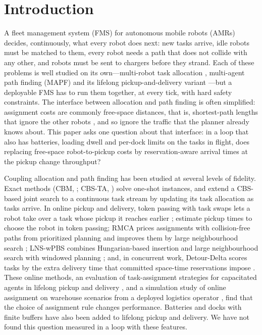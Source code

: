 \section{Introduction}\label{sec:intro}


A fleet management system (FMS) for autonomous mobile robots (AMRs) decides,
continuously, what every robot does next: new tasks arrive, idle robots must be
matched to them, every robot needs a path that does not collide with any other,
and robots must be sent to chargers before they strand. Each of these problems is well
studied on its own---multi-robot task allocation
\citep{gerkey2004formal,korsah2013comprehensive}, multi-agent path finding
(MAPF) \citep{stern2019mapf,sharon2015cbs} and its lifelong
pickup-and-delivery variant \citep{ma2017lifelong,li2021rhcr}---but a
deployable FMS has to run them together, at every tick, with hard safety
constraints. The interface between allocation and path finding is often
simplified: assignment costs are commonly free-space distances, that is,
shortest-path lengths that ignore the other robots
\citep{ma2017lifelong,liu2019task}, and so ignore the traffic that the planner
already knows about. This paper asks one question about that interface: in a loop
that also has batteries, loading dwell and per-dock limits on the tasks in
flight, does replacing free-space robot-to-pickup costs by reservation-aware
arrival times at the pickup change throughput?

Coupling allocation and path finding has been studied at several levels of
fidelity. Exact methods (CBM, \citealp{ma2016optimal}; CBS-TA,
\citealp{honig2018cbsta}) solve one-shot instances, and \citet{fan2025joint}
extend a CBS-based joint search to a continuous task stream by updating
its task allocation as tasks arrive. In online pickup and delivery, token passing with
task swaps lets a robot take over a task whose pickup it reaches earlier
\citep{ma2017lifelong}; \citet{shimokawa2022improvement} estimate pickup
times to choose the robot in token passing; RMCA prices assignments with
collision-free paths from prioritized planning and improves them by large
neighbourhood search \citep{chen2021integrated}; LNS-wPBS combines
Hungarian-based insertion and large neighbourhood search with windowed
planning \citep{xu2022multigoal}; and, in concurrent work, Detour-Delta scores
tasks by the extra delivery time that committed space-time reservations
impose \citep{hirayama2026detour}. These online methods, an evaluation of
task-assignment strategies for capacitated agents in lifelong pickup and
delivery \citep{cilden2025task}, and a simulation study of online assignment
on warehouse scenarios from a deployed logistics operator
\citep{zhu2026combined},
find that the choice of assignment rule changes performance. Batteries
\citep{kudo2024anytime,bavaro2025mapdb,tang2026energy} and docks with finite buffers
\citep{zang2026handover} have also been added to lifelong pickup and
delivery. We have not found this question measured in a loop with these
features.

